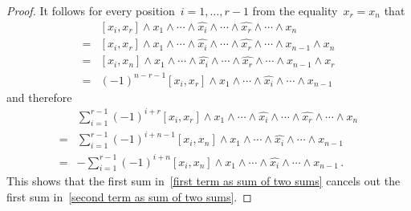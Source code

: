 \begin{proof}
	It follows for every position~$i = 1, \dotsc, r-1$ from the equality~$x_r = x_n$ that
	\begin{align*}
		{}&
		[x_i, x_r] \wedge x_1 \wedge \dotsb \wedge \widehat{x_i} \wedge \dotsb \wedge \widehat{x_r} \wedge \dotsb \wedge x_n
		\\
		={}&
		[x_i, x_r] \wedge x_1 \wedge \dotsb \wedge \widehat{x_i} \wedge \dotsb \wedge \widehat{x_r} \wedge \dotsb \wedge x_{n-1} \wedge x_n
		\\
		={}&
		[x_i, x_n] \wedge x_1 \wedge \dotsb \wedge \widehat{x_i} \wedge \dotsb \wedge \widehat{x_r} \wedge \dotsb \wedge x_{n-1} \wedge x_r
		\\
		={}&
		(-1)^{n-r-1}
		[x_i, x_r] \wedge x_1 \wedge \dotsb \wedge \widehat{x_i} \wedge \dotsb \wedge x_{n-1}
	\end{align*}
	and therefore
	\begin{align*} 
		{}&
		\sum_{i=1}^{r-1}
		(-1)^{i+r}
		[x_i, x_r] \wedge x_1 \wedge \dotsb \wedge \widehat{x_i} \wedge \dotsb \wedge \widehat{x_r} \wedge \dotsb \wedge x_n
		\\
		={}&
		\sum_{i=1}^{r-1}
		(-1)^{i+n-1}
		[x_i, x_n] \wedge x_1 \wedge \dotsb \wedge \widehat{x_i} \wedge \dotsb \wedge x_{n-1}
		\\
		={}&
		-
		\sum_{i=1}^{r-1}
		(-1)^{i+n}
		[x_i, x_n] \wedge x_1 \wedge \dotsb \wedge \widehat{x_i} \wedge \dotsb \wedge x_{n-1} \,.
	\end{align*}
	This shows that the first sum in~\eqref{first term as sum of two sums} cancels out the first sum in~\eqref{second term as sum of two sums}.


\end{proof}
